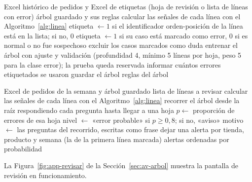 \begin{algorithm}[H]
\caption{Entrenamiento del árbol (botón «Entrenar modelo»)}
\label{alg:entrenar}
\begin{algorithmic}[1]
\Require Excel histórico de pedidos y Excel de etiquetas (hoja de revisión o lista de líneas con error)
\Ensure árbol guardado y sus reglas
\State calcular las señales de cada línea con el Algoritmo~\ref{alg:linea}
    \State etiqueta $\gets 1$ si el identificador orden-posición de la línea está en la lista; si no, $0$
\Else
    \State etiqueta $\gets 1$ si su caso está marcado como error, $0$ si es normal o no fue sospechoso
    \State excluir los casos marcados como duda
\EndIf
\State entrenar el árbol con ajuste y validación (profundidad 4, mínimo 5 líneas por hoja, peso 5 para la clase error); la prueba queda reservada
\State informar cuántos errores etiquetados se usaron
\State guardar el árbol
\State \Return reglas del árbol
\end{algorithmic}
\end{algorithm}

\begin{algorithm}[H]
\caption{Revisión de pedidos (botón «Revisar pedidos»)}
\label{alg:revisar}
\begin{algorithmic}[1]
\Require Excel de pedidos de la semana y árbol guardado
\Ensure lista de líneas a revisar
\State calcular las señales de cada línea con el Algoritmo~\ref{alg:linea}
    \State recorrer el árbol desde la raíz respondiendo cada pregunta hasta llegar a una hoja
    \State $p \gets$ proporción de errores de esa hoja
        \State nivel $\gets$ «error probable» si $p \geq 0{,}8$; si no, «aviso»
        \State motivo $\gets$ las preguntas del recorrido, escritas como frase
    \EndIf
\EndFor
\State dejar una alerta por tienda, producto y semana (la de la primera línea marcada)
\State \Return alertas ordenadas por probabilidad
\end{algorithmic}
\end{algorithm}

La Figura~\ref{fig:app-revisar} de la Sección~\ref{sec:av-arbol} muestra la pantalla de revisión en funcionamiento.
